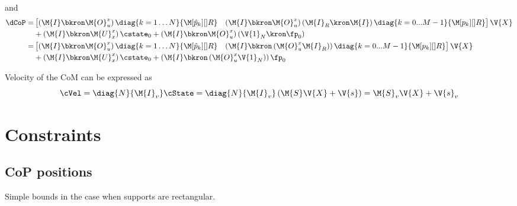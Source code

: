 %
and
%
\begin{align}
    \dCoP
    =&
    \begin{bmatrix}
        \left(\M{I} \bkron \M{O}_u^x \right) \diag{k = 1 \dots N}{\M[\hat{p}_k][]{R}}
        &
        \left(\M{I} \bkron \M{O}_u^x \right)
        \left(
            \M{I}_R \kron \M{I}
        \right)
        \diag{k = 0...M-1}{ \M[p_{k}][]{R} }\\
    \end{bmatrix}
    \V{X}
    \\
    &
    +
    \left(\M{I} \bkron \M{U}_x^x \right) \cstate_0
    +
    \left(\M{I} \bkron \M{O}_u^x \right)
    \left(\V{1}_N \kron \fp_0 \right)
    \\
    = &
    \begin{bmatrix}
        \left(\M{I} \bkron \M{O}_u^x \right) \diag{k = 1 \dots N}{\M[\hat{p}_k][]{R}}
        &
        \left(
            \M{I}
            \bkron
            \left(
                \M{O}_u^x
                \M{I}_R
            \right)
        \right)
        \diag{k = 0...M-1}{ \M[p_{k}][]{R} }\\
    \end{bmatrix}
    \V{X}
    \\
    &
    +
    \left(\M{I} \bkron \M{U}_x^x \right) \cstate_0
    +
    \left(
        \M{I}
        \bkron
        \left(
            \M{O}_u^x
            \V{1}_N
        \right)
    \right)
    \fp_0
    \\
\end{align}
%

Velocity of the \acs{CoM} can be expressed as
%
\begin{equation}
    \cVel =
        \diag{N}{\M{I}_{v}} \cState =
        \diag{N}{\M{I}_{v}} \left( \M{S}\V{X} + \V{s} \right)=
        \M{S}_v \V{X} + \V{s}_v
\end{equation}
%

\section{Constraints}

\subsection{CoP positions}
Simple bounds in the case when supports are rectangular.


